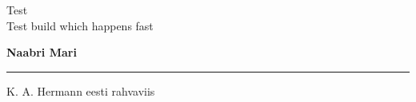 \documentclass[12pt]{extbook}
\begin{document}
\rmfamily

\begin{titlepage}
  \null
  \begin{center}
    \vspace{1.5in}
    {\LARGE Test }\\
    { Test build which happens fast }
    \vfill
  \end{center}
\end{titlepage}

{
  \samepage
  \raggedbottom
  \raggedright
  \sloppy


  \vspace{0.2in}
    \centerline{
      \bfseries
      \large Naabri Mari
    }
  \nopagebreak[4]
  \vspace{0.1in}
  \nopagebreak[4]
  \hrule height 0.05ex
  \nopagebreak[4]
  \vspace{-0.05in}

  {\footnotesize K. A. Hermann \hfill eesti rahvaviis }\\
  \vspace{0.01in}



}
\end{document}
